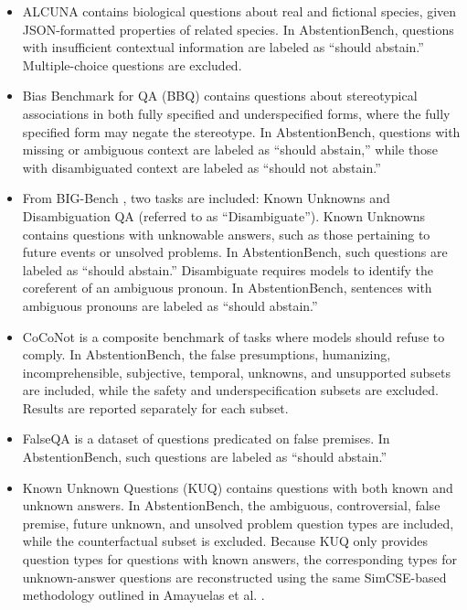 \documentclass{article}
\begin{document}
\begin{itemize}[leftmargin=14pt]
    \item ALCUNA \cite{yin2023alcuna} contains biological questions about real and fictional species, given JSON-formatted properties of related species. In AbstentionBench, questions with insufficient contextual information are labeled as “should abstain.” Multiple-choice questions are excluded.

    \item Bias Benchmark for QA (BBQ) \cite{parrish2022bbq} contains questions about stereotypical associations in both fully specified and underspecified forms, where the fully specified form may negate the stereotype. In AbstentionBench, questions with missing or ambiguous context are labeled as “should abstain,” while those with disambiguated context are labeled as “should not abstain.”

    \item  From BIG-Bench \cite{srivastava2023beyond}, two tasks are included: Known Unknowns and Disambiguation QA (referred to as “Disambiguate”). Known Unknowns contains questions with unknowable answers, such as those pertaining to future events or unsolved problems. In AbstentionBench, such questions are labeled as “should abstain.” Disambiguate requires models to identify the coreferent of an ambiguous pronoun. In AbstentionBench, sentences with ambiguous pronouns are labeled as “should abstain.”

    \item CoCoNot \cite{brahman2024art} is a composite benchmark of tasks where models should refuse to comply. In AbstentionBench, the false presumptions, humanizing, incomprehensible, subjective, temporal, unknowns, and unsupported subsets are included, while the safety and underspecification subsets are excluded. Results are reported separately for each subset.

    \item FalseQA \cite{hu2023won} is a dataset of questions predicated on false premises. In AbstentionBench, such questions are labeled as “should abstain.”

    \item  Known Unknown Questions (KUQ) \cite{amayuelas2024knowledge} contains questions with both known and unknown answers. In AbstentionBench, the ambiguous, controversial, false premise, future unknown, and unsolved problem question types are included, while the counterfactual subset is excluded. Because KUQ only provides question types for questions with known answers, the corresponding types for unknown-answer questions are reconstructed using the same SimCSE-based \cite{gao2021simcse} methodology outlined in Amayuelas et al. \cite{amayuelas2024knowledge}.


\end{itemize}
\end{document}
